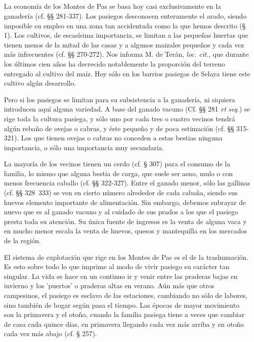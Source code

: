 \documentclass[11pt,spanish,b5paper]{book}
\begin{document}
\subsection{} La economía de los Montes de Pas se basa hoy casi exclusivamente en la ganadería (cf. §§ 281-337). Los pasiegos desconocen enteramente el arado, siendo imposible su empleo en una zona tan accidentada como la que hemos descrito (§ 1). Los cultivos, de escasísima importancia, se limitan a las pequeñas huertas que tienen menos de la mitad de las casas y a algunos maizales pequeños y cada vez más infrecuentes (cf. §§ 270-272). Nos informa M. de Terán, \emph{loc. cit.}, que durante los últimos cien años ha decrecido notablemente la proporción del terreno entregado al cultivo del maíz. Hoy sólo en los barrios pasiegos de Selaya tiene este cultivo algún desarrollo.

Pero si los pasiegos se limitan para su subsistencia a la ganadería, ni siquiera introducen aquí alguna variedad. A base del ganado vacuno (Cf. §§ 281 \emph{et seq.}) se rige toda la cultura pasiega, y sólo uno por cada tres o cuatro vecinos tendrá algún rebaño de ovejas o cabras, y éste
pequeño y de poca estimación (cf. §§ 315-321). Los que tienen ovejas o cabras no conceden a estas bestias ninguna importancia, o sólo una importancia muy secundaria.

La mayoría de los vecinos tienen un cerdo (cf. § 307) para el consumo de la familia, lo mismo que alguna bestia de carga, que suele ser asno, mulo o con menos frecuencia caballo (cf. §§ 322-327). Entre el ganado menor, sólo las gallinas (cf. §§ 328~333) se ven en cierto número alrededor de cada cabaña, siendo sus huevos elemento importante de alimentación. Sin embargo, debemos subrayar de nuevo que es al  ganado vacuno y al cuidado de sus prados a los que el pasiego presta toda su atención. Su única fuente de ingresos es la venta de alguna vaca y en mucho menor escala la venta de huevos, quesos y mantequilla en los mercados de la región. 

El sistema de explotación que rige en los Montes de Pas es el de la trashumación. Es esto sobre todo lo que imprime al modo de vivir pasiego su carácter tan singular. La vida se hace en un continuo ir y venir entre las praderas bajas en invierno y los 'puertos' o praderas altas en
verano. Aún más que otros campesinos, el pasiego es esclavo de las estaciones, cambiando no sólo de labores, sino también de bogar según pasa el tiempo. Las épocas de mayor movimiento son la primavera y el otoño, cuando la familia pasiega tiene a veces que cambiar de casa cada quince días, en primavera llegando cada vez más arriba y en otoño cada vez más abajo (cf. § 257).
\end{document}
